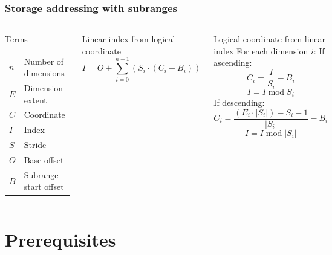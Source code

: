 \documentclass{beamer}
\makeatletter
\newenvironment{conditions}
  {\par\vspace{\abovedisplayskip}\noindent\begin{tabular}{>{$}l<{$} @{${}={}$} l}}
  {\end{tabular}\par\vspace{\belowdisplayskip}}
\makeatother
\begin{document}
\begin{frame}
  \frametitle{Storage addressing with subranges}
  \begin{columns}[c]
    \begin{block}{Terms}
    \begin{conditions}
      n & Number of dimensions \\
      E & Dimension extent \\
      C & Coordinate \\
      I & Index \\
      S & Stride \\
      O & Base offset \\
      B & Subrange start offset \\
    \end{conditions}
    \end{block}
    \begin{block}{Linear index from logical coordinate}
    \begin{equation*}
      I = O + \sum\limits_{i=0}^{n-1} (S_i \cdot (C_i + B_i))
    \end{equation*}
    \end{block}
    \begin{block}{Logical coordinate from linear index}
      For each dimension $i$:
      If ascending:
      \begin{equation*}
        C_i = \frac{I}{S_i} - B_i
      \end{equation*}
      \begin{equation*}
        I = I \operatorname{mod} S_i
      \end{equation*}
      If descending:
      \begin{equation*}
        C_i = \frac{(E_i \cdot \lvert S_i \rvert) - S_i - 1}{\lvert S_i \rvert} - B_i
      \end{equation*}
      \begin{equation*}
        I = I \operatorname{mod} \lvert S_i \rvert
      \end{equation*}
    \end{block}
  \end{columns}
\end{frame}

\section{Prerequisites}


\appendix
\end{document}
